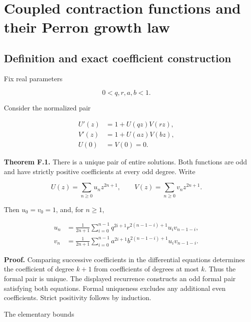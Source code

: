 \hypertarget{v11-coupled_growth_full-coupled-contraction-functions-and-their-perron-growth-law}{%
\chapter[Coupled growth and Perron type]{Coupled contraction functions and their Perron growth
law}\label{app:coupled-growth}\label{v11-coupled_growth_full-coupled-contraction-functions-and-their-perron-growth-law}}

\hypertarget{v11-coupled_growth_full-definition-and-exact-coefficient-construction}{%
\section{Definition and exact coefficient
construction}\label{v11-coupled_growth_full-definition-and-exact-coefficient-construction}}

Fix real parameters

\[
0<q,r,a,b<1.
\]

Consider the normalized pair

\[
\boxed{\begin{aligned}
U'(z)&=1+U(qz)V(rz),\\
V'(z)&=1+U(az)V(bz),\\
U(0)&=V(0)=0.
\end{aligned}}
\]

\textbf{Theorem F.1.} There is a unique pair of entire solutions. Both
functions are odd and have strictly positive coefficients at every odd
degree. Write

\[
U(z)=\sum_{n\ge0}u_nz^{2n+1},\qquad
V(z)=\sum_{n\ge0}v_nz^{2n+1}.
\]

Then \(u_0=v_0=1\), and, for \(n\ge1\),

\[
\begin{aligned}
u_n&=\frac1{2n+1}\sum_{i=0}^{n-1}
 q^{2i+1}r^{2(n-1-i)+1}u_i v_{n-1-i},\\
v_n&=\frac1{2n+1}\sum_{i=0}^{n-1}
 a^{2i+1}b^{2(n-1-i)+1}u_i v_{n-1-i}.
\end{aligned}
\]

\textbf{Proof.} Comparing successive coefficients in the differential
equations determines the coefficient of degree \(k+1\) from coefficients
of degrees at most \(k\). Thus the formal pair is unique. The displayed
recurrence constructs an odd formal pair satisfying both equations.
Formal uniqueness excludes any additional even coefficients. Strict
positivity follows by induction.

The elementary bounds

